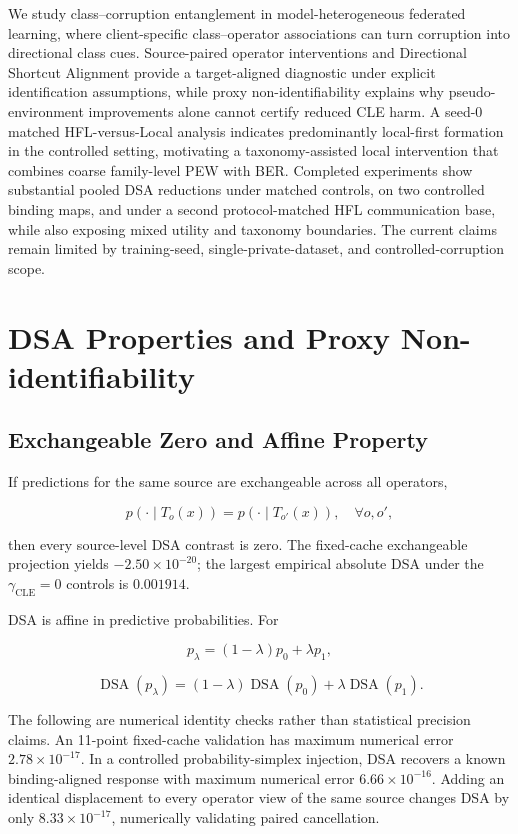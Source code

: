 \documentclass[10pt,twocolumn]{article}
\begin{document}
We study class--corruption entanglement in model-heterogeneous federated learning, where client-specific class--operator associations can turn corruption into directional class cues. Source-paired operator interventions and Directional Shortcut Alignment provide a target-aligned diagnostic under explicit identification assumptions, while proxy non-identifiability explains why pseudo-environment improvements alone cannot certify reduced CLE harm. A seed-0 matched HFL-versus-Local analysis indicates predominantly local-first formation in the controlled setting, motivating a taxonomy-assisted local intervention that combines coarse family-level PEW with BER. Completed experiments show substantial pooled DSA reductions under matched controls, on two controlled binding maps, and under a second protocol-matched HFL communication base, while also exposing mixed utility and taxonomy boundaries. The current claims remain limited by training-seed, single-private-dataset, and controlled-corruption scope.

\appendix
\section{DSA Properties and Proxy Non-identifiability}

\subsection{Exchangeable Zero and Affine Property}

If predictions for the same source are exchangeable across all operators,

\[
p(\cdot\mid T_o(x))=p(\cdot\mid T_{o'}(x)),\quad\forall o,o',
\]

then every source-level DSA contrast is zero. The fixed-cache exchangeable projection yields \(-2.50\times10^{-20}\); the largest empirical absolute DSA under the \(\gamma_{\mathrm{CLE}}=0\) controls is \(0.001914\).

DSA is affine in predictive probabilities. For

\[
p_\lambda=(1-\lambda)p_0+\lambda p_1,
\]

\[
\operatorname{DSA}(p_\lambda)
=(1-\lambda)\operatorname{DSA}(p_0)
+\lambda\operatorname{DSA}(p_1).
\]

The following are numerical identity checks rather than statistical precision claims. An 11-point fixed-cache validation has maximum numerical error \(2.78\times10^{-17}\). In a controlled probability-simplex injection, DSA recovers a known binding-aligned response with maximum numerical error \(6.66\times10^{-16}\). Adding an identical displacement to every operator view of the same source changes DSA by only \(8.33\times10^{-17}\), numerically validating paired cancellation.
\end{document}
